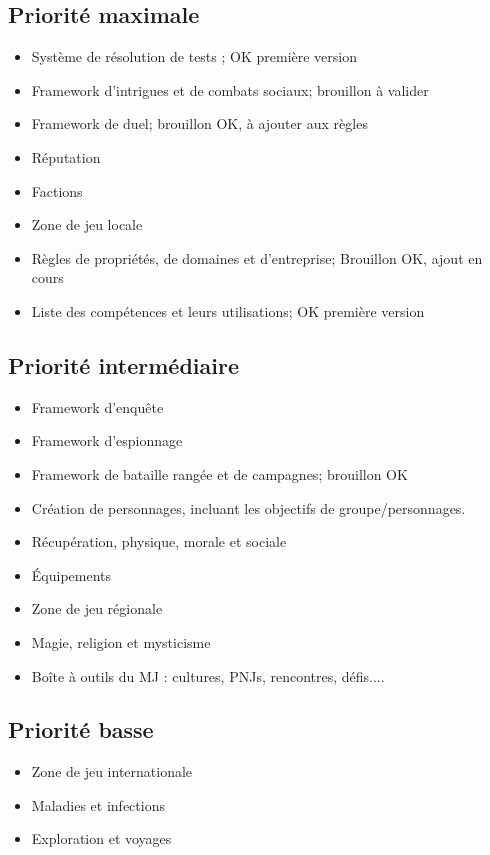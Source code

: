 \documentclass[10pt,a4paper]{book}
\begin{document}
\subsection*{Priorité maximale}
\begin{itemize}
\item Système de résolution de tests ; OK première version
\item Framework d'intrigues et de combats sociaux; brouillon à valider
\item Framework de duel; brouillon OK, à ajouter aux règles
\item Réputation
\item Factions
\item Zone de jeu locale
\item Règles de propriétés, de domaines et d'entreprise; Brouillon OK, ajout en cours
\item Liste des compétences et leurs utilisations; OK première version
\end{itemize}
\subsection*{Priorité intermédiaire}
\begin{itemize}
\item Framework d'enquête
\item Framework d'espionnage
\item Framework de bataille rangée et de campagnes; brouillon OK
\item Création de personnages, incluant les objectifs de groupe/personnages.
\item Récupération, physique, morale et sociale
\item Équipements
\item Zone de jeu régionale
\item Magie, religion et mysticisme
\item Boîte à outils du MJ : cultures, PNJs, rencontres, défis....
\end{itemize}
\subsection*{Priorité basse}
\begin{itemize}
\item Zone de jeu internationale
\item Maladies et infections
\item Exploration et voyages
\end{itemize}
\end{document}

